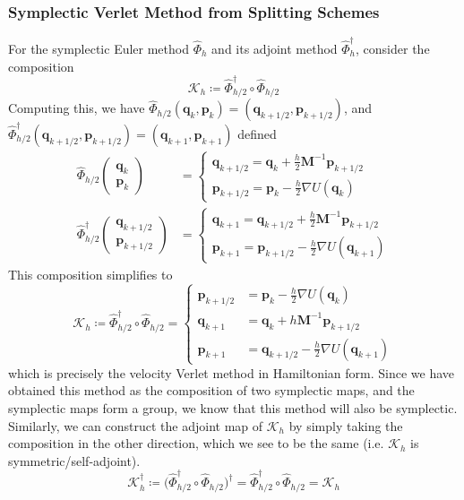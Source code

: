 \documentclass{article}
\theoremstyle{remark}
\theoremstyle{definition}
\begin{document}
\subsubsection{Symplectic Verlet Method from Splitting Schemes}
For the symplectic Euler method $\hat{\Phi}_h$ and its adjoint method $\hat{\Phi}_h^\dagger$, consider the composition 
\[\mathcal{K}_h \coloneqq \hat{\Phi}_{h/2}^\dagger \circ \hat{\Phi}_{h/2}\]
Computing this, we have $\hat{\Phi}_{h/2} (\mathbf{q}_k, \mathbf{p}_k) = (\mathbf{q}_{k + 1/2}, \mathbf{p}_{k + 1/2})$, and $\hat{\Phi}_{h/2}^\dagger (\mathbf{q}_{k + 1/2}, \mathbf{p}_{k + 1/2}) = (\mathbf{q}_{k+1}, \mathbf{p}_{k+1})$ defined 
\begin{align*}
    \hat{\Phi}_{h/2} \begin{pmatrix} \mathbf{q}_k \\ \mathbf{p}_k \end{pmatrix} & = \begin{cases} 
    \mathbf{q}_{k + 1/2} = \mathbf{q}_k + \frac{h}{2} \mathbf{M}^{-1} \mathbf{p}_{k + 1/2} \\
    \mathbf{p}_{k + 1/2} = \mathbf{p}_k - \frac{h}{2} \nabla U(\mathbf{q}_k)
    \end{cases} \\
    \hat{\Phi}_{h/2}^\dagger \begin{pmatrix} \mathbf{q}_{k+ 1/2} \\ \mathbf{p}_{k+ 1/2} \end{pmatrix} & = \begin{cases} 
    \mathbf{q}_{k+1} = \mathbf{q}_{k + 1/2} + \frac{h}{2} \mathbf{M}^{-1} \mathbf{p}_{k + 1/2} \\
    \mathbf{p}_{k+1} = \mathbf{p}_{k + 1/2} - \frac{h}{2} \nabla U (\mathbf{q}_{k+1})
    \end{cases} 
\end{align*}
This composition simplifies to 
\[\mathcal{K}_h \coloneqq \hat{\Phi}_{h/2}^\dagger \circ \hat{\Phi}_{h/2} = \begin{cases} 
\mathbf{p}_{k + 1/2} & = \mathbf{p}_k - \frac{h}{2} \nabla U(\mathbf{q}_k) \\
\mathbf{q}_{k + 1} & = \mathbf{q}_k + h \mathbf{M}^{-1} \mathbf{p}_{k + 1/2} \\
\mathbf{p}_{k + 1} & = \mathbf{q}_{k + 1/2} - \frac{h}{2} \nabla U (\mathbf{q}_{k+1})
\end{cases}\]
which is precisely the velocity Verlet method in Hamiltonian form. Since we have obtained this method as the composition of two symplectic maps, and the symplectic maps form a group, we know that this method will also be symplectic. Similarly, we can construct the adjoint map of $\mathcal{K}_h$ by simply taking the composition in the other direction, which we see to be the same (i.e. $\mathcal{K}_h$ is symmetric/self-adjoint). 
\[\mathcal{K}_h^\dagger \coloneqq \big(\hat{\Phi}_{h/2}^\dagger \circ \hat{\Phi}_{h/2}\big)^\dagger = \hat{\Phi}_{h/2}^\dagger \circ \hat{\Phi}_{h/2} = \mathcal{K}_h \]
\end{document}
